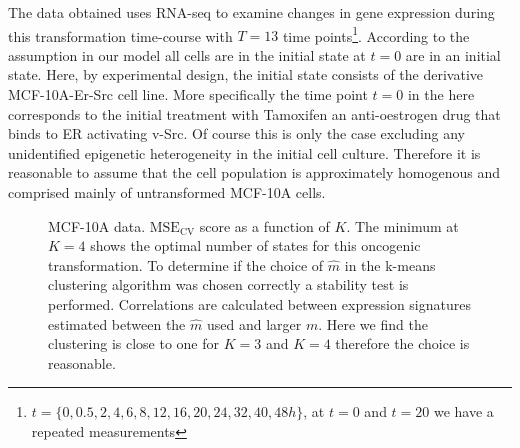 The data obtained uses RNA-seq to examine changes in gene expression during this transformation time-course with $T=13$ time points\footnote{$t=\lbrace 0, 0.5,  2,  4,  6,  8, 12, 16, 20, 24, 32, 40, 48h \rbrace$, at $t=0$ and $t=20$ we have a repeated measurements}. According to the assumption in our model all cells are in the initial state at $t=0$ are in an initial state. Here, by experimental design, the initial state consists of the derivative MCF-10A-Er-Src cell line. More specifically the time point $t=0$ in the here corresponds to the initial treatment with Tamoxifen an anti-oestrogen drug that binds to ER activating v-Src. Of course this is only the case excluding any unidentified epigenetic heterogeneity in the initial cell culture.  Therefore it is reasonable to assume that the cell population is approximately homogenous and comprised mainly of untransformed MCF-10A cells.



\begin{figure}
  \centering
    \caption{MCF-10A data.  $\mathrm{MSE_{CV}}$ score as a function of $K$. The minimum at $K = 4$ shows the optimal number of states for this oncogenic transformation.  To determine if the choice of $\hat{m}$ in the k-means clustering algorithm was chosen correctly a stability test is performed. Correlations are calculated between expression signatures estimated between the $\hat{m}$ used and larger $m$. Here we find the clustering is close to one for $K=3$ and $K=4$ therefore the choice is reasonable.}
  \label{fig:data-m-k}
\end{figure}

